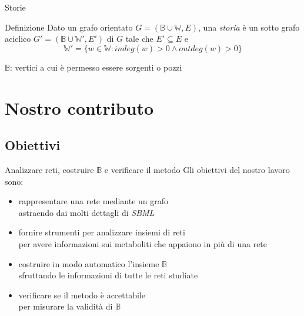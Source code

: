 \documentclass[8pt]{beamer}
\begin{document}
\begin{frame}{Storie}
  \begin{block}{Definizione}
    Dato un grafo orientato $G = (\mathbb{B} \cup \mathbb{W}, E)$, una
    \emph{storia} \`e un sotto grafo aciclico $G' = (\mathbb{B} \cup
    \mathbb{W'}, E')$ di $G$ tale che $E' \subseteq E $ e
  \begin{displaymath}
    \mathbb{W'} = \{w \in \mathbb{W}: indeg(w) > 0 \wedge outdeg(w)
    > 0\}
  \end{displaymath}
\end{block}
$\mathbb{B}$: vertici a cui \`e permesso essere sorgenti o pozzi
\end{frame}

\section{Nostro contributo}

\subsection{Obiettivi}

\begin{frame}{Analizzare reti, costruire $\mathbb{B}$ e verificare il
    metodo}
Gli obiettivi del nostro lavoro sono:
\begin{itemize}
\item<1-> rappresentare una rete mediante un grafo\\
  \footnotesize{astraendo dai molti dettagli di \emph{SBML}}
\item<2-> fornire strumenti per analizzare insiemi di reti\\
  \footnotesize{per avere informazioni sui metaboliti che appaiono in
    pi\`u di una rete}
\item<3-> costruire in modo automatico l'insieme $\mathbb{B}$\\
  \footnotesize{sfruttando le informazioni di tutte le reti studiate}
\item<4-> verificare se il metodo \`e accettabile\\
  \footnotesize{per misurare la validit\`a di $\mathbb{B}$}
\end{itemize}
\end{frame}
\end{document}
